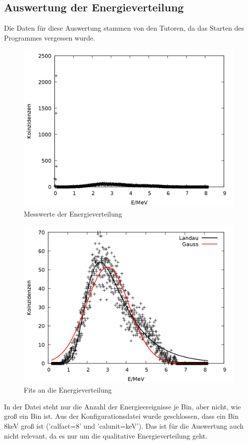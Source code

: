 \subsection{Auswertung der Energieverteilung}

Die Daten für diese Auswertung stammen von den Tutoren, da das Starten des Programmes vergessen wurde.\\

\begin{figure}
\centering
\includegraphics[width=0.75\linewidth]{data/friedrich/mca_raw.png}
\caption{Messwerte der Energieverteilung}
\label{fig:mca_raw}
\end{figure}

\begin{figure}
\centering
\includegraphics[width=0.75\linewidth]{data/friedrich/mca.png}
\caption{Fits an die Energieverteilung}
\label{fig:mca}
\end{figure}

In der Datei steht nur die Anzahl der Energieereignisse je Bin, aber nicht, wie groß ein Bin ist. Aus der Konfigurationsdatei wurde geschlossen, dass ein Bin 8keV groß ist ('calfact=8' und 'calunit=keV'). Das ist für die Auswertung auch nicht relevant, da es nur um die qualitative Energieverteilung geht.  

